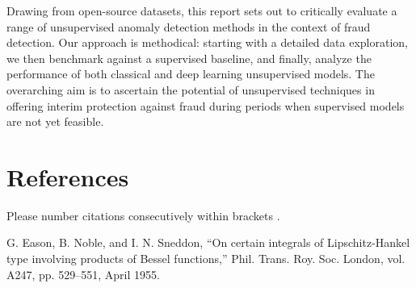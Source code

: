 \documentclass[conference]{IEEEtran}
\begin{document}
Drawing from open-source datasets, this report sets out to critically evaluate a range of unsupervised anomaly detection methods in the context of fraud detection. Our approach is methodical: starting with a detailed data exploration, we then benchmark against a supervised baseline, and finally, analyze the performance of both classical and deep learning unsupervised models. The overarching aim is to ascertain the potential of unsupervised techniques in offering interim protection against fraud during periods when supervised models are not yet feasible.




\section*{References}

Please number citations consecutively within brackets \cite{b1}.

\begin{thebibliography}{00}
     G. Eason, B. Noble, and I. N. Sneddon, ``On certain integrals of Lipschitz-Hankel type involving products of Bessel functions,'' Phil. Trans. Roy. Soc. London, vol. A247, pp. 529--551, April 1955.
\end{thebibliography}
\end{document}
